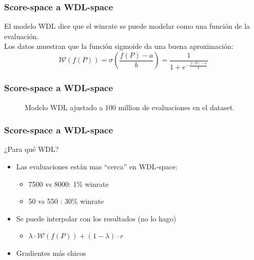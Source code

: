 \begin{frame}
\frametitle{Score-space a WDL-space}
El modelo WDL dice que el winrate se puede modelar como una función de la evaluación. \pause \\

Los datos muestran que la función sigmoide da una buena aproximación:
\[
\mathcal{W}(f(P)) = \sigma\left(\frac{f(P)-a}{b}\right) = \frac{1}{1 + e^{-\frac{f(P)-a}{b}}}
\]
\end{frame}

\begin{frame}
\frametitle{Score-space a WDL-space}
\begin{figure}[H]
\centering
{}
\caption{Modelo WDL ajustado a 100 million de evaluaciones en el dataset.}
\end{figure}
\end{frame}

\begin{frame}
\frametitle{Score-space a WDL-space}
¿Para qué WDL? \pause
\begin{itemize}
\item<2-> Las evaluaciones están mas \enquote{cerca} en WDL-space:
\begin{itemize}
\item 7500 vs 8000: 1\% winrate
\item 50 vs 550 : 30\% winrate
\end{itemize}
\item<3-> Se puede interpolar con los resultados (no lo hago)
\begin{itemize}
\item $\lambda \cdot \mathcal{W}(f(P)) + (1 - \lambda) \cdot r$
\end{itemize}
\item<4-> Gradientes más chicos
\end{itemize}

\end{frame}

